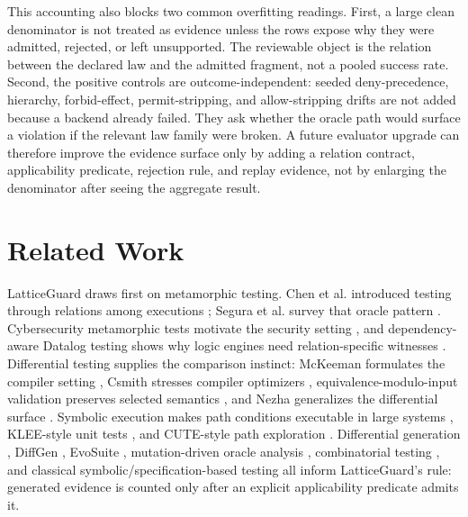 \documentclass[10pt,conference]{IEEEtran}
\begin{document}
This accounting also blocks two common overfitting readings.  First, a large clean denominator is not treated as evidence unless the rows expose why they were admitted, rejected, or left unsupported.  The reviewable object is the relation between the declared law and the admitted fragment, not a pooled success rate.  Second, the positive controls are outcome-independent: seeded deny-precedence, hierarchy, forbid-effect, permit-stripping, and allow-stripping drifts are not added because a backend already failed.  They ask whether the oracle path would surface a violation if the relevant law family were broken.  A future evaluator upgrade can therefore improve the evidence surface only by adding a relation contract, applicability predicate, rejection rule, and replay evidence, not by enlarging the denominator after seeing the aggregate result.

\section{Related Work}
\label{sec:related}
LatticeGuard draws first on metamorphic testing.  Chen et al. introduced testing through relations among executions \cite{chen1998metamorphic}; Segura et al. survey that oracle pattern \cite{segura2016survey}.  Cybersecurity metamorphic tests motivate the security setting \cite{chen2016mtcybersecurity}, and dependency-aware Datalog testing shows why logic engines need relation-specific witnesses \cite{mansur2023datalog}.  Differential testing supplies the comparison instinct: McKeeman formulates the compiler setting \cite{mckeeman1998differential}, Csmith stresses compiler optimizers \cite{yang2011csmith}, equivalence-modulo-input validation preserves selected semantics \cite{le2014emi}, and Nezha generalizes the differential surface \cite{petsios2017nezha}.  Symbolic execution makes path conditions executable in large systems \cite{godefroid2008sage}, KLEE-style unit tests \cite{cadar2008klee}, and CUTE-style path exploration \cite{sen2005cute}.  Differential generation \cite{person2008differential}, DiffGen \cite{taneja2010diffgen}, EvoSuite \cite{fraser2011evosuite}, mutation-driven oracle analysis \cite{fraser2012mutation}, combinatorial testing \cite{nie2011survey}, and classical symbolic/specification-based testing \cite{clarke1976system} \cite{king1976symbolic} \cite{khurshid2003testera} all inform LatticeGuard's rule: generated evidence is counted only after an explicit applicability predicate admits it.
\end{document}
